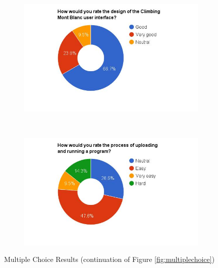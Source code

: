 \begin{figure}
    \begin{subfigure}[h]{0.48\textwidth}
        \centerline{\includegraphics[width=1.5\textwidth]{results/design_cmb.jpg}}
        \caption{}
        \label{fig:cmb-design}
    \end{subfigure}
    ~ %
    \hfill
    \begin{subfigure}[h]{0.48\textwidth}
        \centerline{\includegraphics[width=1.5\textwidth]{results/submission_cmb.jpg}}
        \caption{}
        \label{fig:cmb-submission}
    \end{subfigure}
    \caption{Multiple Choice Results (continuation of Figure \ref{fig:multiplechoice})}
    \label{fig:multiplechoice1}
\end{figure}

